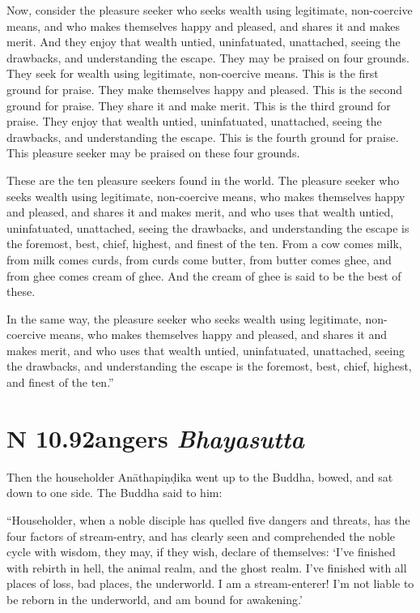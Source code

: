 \documentclass[12pt,openany]{book}%
\newcommand*{\suttatitleacronym}[1]{\smaller[2]{#1}\vspace*{.3em}}
\newcommand*{\suttatitletranslation}[1]{\linebreak{#1}}
\newcommand*{\suttatitleroot}[1]{\linebreak\smaller[2]\itshape{#1}}
\newcommand*{\tocacronym}[1]{\hspace*{-3.3em}{#1}\quad}
\newcommand*{\toctranslation}[1]{#1}
\newcommand*{\tocroot}[1]{(\textit{#1})}
\begin{document}
Now, consider the pleasure seeker who seeks wealth using legitimate, non-coercive means, and who makes themselves happy and pleased, and shares it and makes merit. And they enjoy that wealth untied, uninfatuated, unattached, seeing the drawbacks, and understanding the escape. They may be praised on four grounds. They seek for wealth using legitimate, non-coercive means. This is the first ground for praise. They make themselves happy and pleased. This is the second ground for praise. They share it and make merit. This is the third ground for praise. They enjoy that wealth untied, uninfatuated, unattached, seeing the drawbacks, and understanding the escape. This is the fourth ground for praise. This pleasure seeker may be praised on these four grounds. 

These are the ten pleasure seekers found in the world. The pleasure seeker who seeks wealth using legitimate, non-coercive means, who makes themselves happy and pleased, and shares it and makes merit, and who uses that wealth untied, uninfatuated, unattached, seeing the drawbacks, and understanding the escape is the foremost, best, chief, highest, and finest of the ten. From a cow comes milk, from milk comes curds, from curds come butter, from butter comes ghee, and from ghee comes cream of ghee. And the cream of ghee is said to be the best of these. 

In the same way, the pleasure seeker who seeks wealth using legitimate, non-coercive means, who makes themselves happy and pleased, and shares it and makes merit, and who uses that wealth untied, uninfatuated, unattached, seeing the drawbacks, and understanding the escape is the foremost, best, chief, highest, and finest of the ten.” 

%
\section*{{\suttatitleacronym AN 10.92}{\suttatitletranslation Dangers }{\suttatitleroot Bhayasutta}}
\addcontentsline{toc}{section}{\tocacronym{AN 10.92} \toctranslation{Dangers } \tocroot{Bhayasutta}}

Then the householder \textsanskrit{Anāthapiṇḍika} went up to the Buddha, bowed, and sat down to one side. The Buddha said to him: 

“Householder, when a noble disciple has quelled five dangers and threats, has the four factors of stream-entry, and has clearly seen and comprehended the noble cycle with wisdom, they may, if they wish, declare of themselves: ‘I’ve finished with rebirth in hell, the animal realm, and the ghost realm. I’ve finished with all places of loss, bad places, the underworld. I am a stream-enterer! I’m not liable to be reborn in the underworld, and am bound for awakening.’ 
\end{document}
